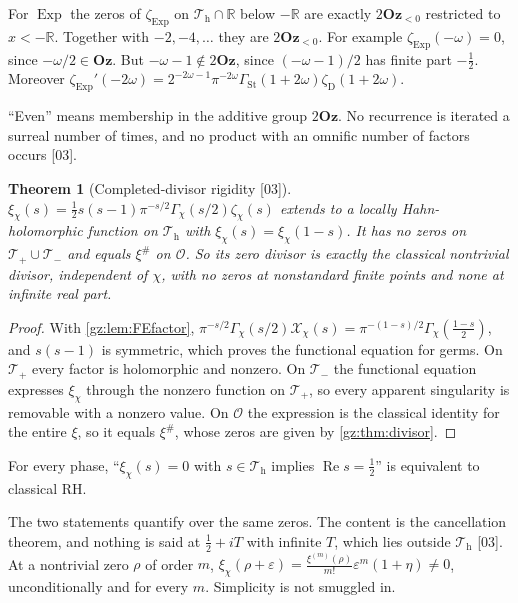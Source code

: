 \documentclass[11pt,a4paper]{article}
\numberwithin{equation}{section}
\newtheorem{theorem}{Theorem}[section]
\theoremstyle{definition}
\theoremstyle{remark}
\newcommand{\Oz}{\mathbf{Oz}}
\newcommand{\R}{\mathbb R}
\newcommand{\OO}{\mathcal O}
\newcommand{\eps}{\varepsilon}
\renewcommand{\Re}{\operatorname{Re}}
\newcommand{\Exp}{\operatorname{Exp}}
\newcommand{\GSt}{\Gamma_{\mathrm{St}}}
\newcommand{\zD}{\zeta_{\mathrm D}}
\newcommand{\xip}{\xi^{\#}}
\newcommand{\FE}{\mathcal X}
\newcommand{\Tp}{\mathcal T_{+}}
\newcommand{\Tm}{\mathcal T_{-}}
\newcommand{\Th}{\mathcal T_{\mathrm h}}
\newcommand{\src}[1]{\textup{[#1]}}
\begin{document}
\begin{corollary}[Canonical trivial zeros \src{03}]\label{gz:cor:canonical-zeros}
For $\Exp$ the zeros of $\zeta_{\Exp}$ on $\Th\cap\R$ below $-\R$ are exactly
$2\Oz_{<0}$ restricted to $x<-\R$. Together with $-2,-4,\dots$ they are
$2\Oz_{<0}$. For example $\zeta_{\Exp}(-\omega)=0$, since $-\omega/2\in\Oz$.
But $-\omega-1\notin2\Oz$, since $(-\omega-1)/2$ has finite part
$-\tfrac12$. Moreover $\zeta_{\Exp}'(-2\omega)=2^{-2\omega-1}\pi^{-2\omega}\GSt(1+2\omega)\zD(1+2\omega)$.
\end{corollary}
``Even'' means membership in the additive group $2\Oz$. No recurrence is
iterated a surreal number of times, and no product with an omnific number of
factors occurs \src{03}.

\begin{theorem}[Completed-divisor rigidity \src{03}]\label{gz:thm:xi-tube}
$\xi_\chi(s)=\tfrac12s(s-1)\pi^{-s/2}\Gamma_\chi(s/2)\zeta_\chi(s)$ extends to a
locally Hahn-holomorphic function on $\Th$ with $\xi_\chi(s)=\xi_\chi(1-s)$.
It has no zeros on $\Tp\cup\Tm$ and equals $\xip$ on $\OO$. So its zero
divisor is exactly the classical nontrivial divisor, independent of $\chi$,
with no zeros at nonstandard finite points and none at infinite real part.
\end{theorem}
\begin{proof}
With \cref{gz:lem:FEfactor},
$\pi^{-s/2}\Gamma_\chi(s/2)\FE_\chi(s)=\pi^{-(1-s)/2}\Gamma_\chi(\tfrac{1-s}2)$,
and $s(s-1)$ is symmetric, which proves the functional equation for germs.
On $\Tp$ every factor is holomorphic and nonzero. On $\Tm$ the functional
equation expresses $\xi_\chi$ through the nonzero function on $\Tp$, so every
apparent singularity is removable with a nonzero value. On $\OO$ the
expression is the classical identity for the entire $\xi$, so it equals
$\xip$, whose zeros are given by \cref{gz:thm:divisor}.
\end{proof}

\begin{corollary}[Horizontal RH \src{03}]\label{gz:cor:horizontalRH}
For every phase, ``$\xi_\chi(s)=0$ with $s\in\Th$ implies $\Re s=\tfrac12$''
is equivalent to classical RH.
\end{corollary}
The two statements quantify over the same zeros. The content is the
cancellation theorem, and nothing is said at $\tfrac12+iT$ with infinite
$T$, which lies outside $\Th$ \src{03}. At a nontrivial zero $\rho$ of order
$m$, $\xi_\chi(\rho+\eps)=\frac{\xi^{(m)}(\rho)}{m!}\eps^m(1+\eta)\ne0$,
unconditionally and for every $m$. Simplicity is not smuggled in.
\end{document}
